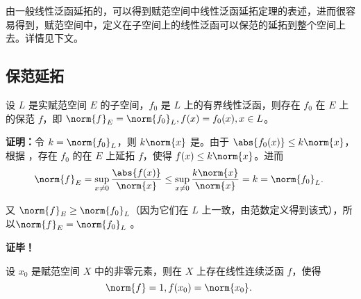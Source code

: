 

由一般线性泛函延拓的，可以得到赋范空间中线性泛函延拓定理的表述，进而很容易得到，赋范空间中，定义在子空间上的线性泛函可以保范的延拓到整个空间上去。详情见下文。

\subsection{保范延拓}

\begin{theorem}{}
设 $L$ 是实赋范空间 $E$ 的子空间，$f_0$ 是 $L$ 上的有界线性泛函，则存在 $f_0$ 在 $E$ 上的保范 $f$，即 $\norm{f}_{E}=\norm{f_0}_{L},f(x)=f_0(x),x\in L$。
\end{theorem}

\textbf{证明：}令 $k=\norm{f_0}_{L}$，则 $k\norm{x}$ 是。由于 $\abs{f_0(x)}\leq k\norm{x}$，根据 ，存在 $f_0$ 的在 $E$ 上延拓 $f$，使得 $f(x)\leq k\norm{x}$。进而
\begin{equation}
\norm{f}_E=\sup_{x\neq0}\frac{\abs{f(x)}}{\norm{x}}\leq\sup_{x\neq0}\frac{k\norm{x}}{\norm{x}}=k=\norm{f_0}_L.~
\end{equation}
 
又 $\norm{f}_E\geq \norm{f_0}_L$（因为它们在 $L$ 上一致，由范数定义得到该式），所以$\norm{f}_{E}=\norm{f_0}_{L}$ 。

\textbf{证毕！}


\begin{corollary}{}
设 $x_0$ 是赋范空间 $X$ 中的非零元素，则在 $X$ 上存在线性连续泛函 $f$，使得
\begin{equation}
\norm{f}=1,f(x_0)=\norm{x_0}.~
\end{equation}

\end{corollary}




